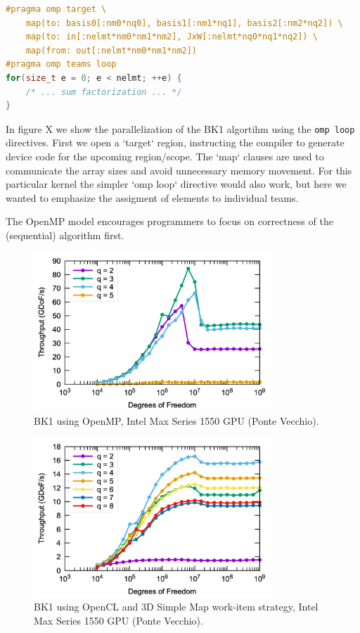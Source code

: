 \documentclass[a4paper,12pt]{article}
\begin{document}
\begin{lstlisting}[language=C++,caption={Simple C++ hello world},label={lst:cpp-hello}]
#pragma omp target \
    map(to: basis0[:nm0*nq0], basis1[:nm1*nq1], basis2[:nm2*nq2]) \
    map(to: in[:nelmt*nm0*nm1*nm2], JxW[:nelmt*nq0*nq1*nq2]) \
    map(from: out[:nelmt*nm0*nm1*nm2])
#pragma omp teams loop
for(size_t e = 0; e < nelmt; ++e) {
    /* ... sum factorization ... */
}
\end{lstlisting}

In figure X we show the parallelization of the BK1 algortihm using the \texttt{omp loop} directives. First we open a `target` region, instructing the compiler to generate
device code for the upcoming region/scope. The `map` clauses are used to communicate the
array sizes and avoid unnecessary memory movement.
For this particular kernel the simpler `omp loop` directive would also work, but here we wanted
to emphasize the assigment of elements to individual teams.

The OpenMP model encourages programmers to focus on correctness of the
(sequential) algorithm first.

\begin{figure}[htbp]
  \centering
  \includegraphics[width=0.8\textwidth]{pvc_openmp} %
  \caption{BK1 using OpenMP, Intel Max Series 1550 GPU (Ponte Vecchio).}
  \label{fig:pvc_openmp}
\end{figure}

\begin{figure}[htbp]
  \centering
  \includegraphics[width=0.8\textwidth]{pvc_opencl} %
  \caption{BK1 using OpenCL and 3D Simple Map work-item strategy, Intel Max Series 1550 GPU (Ponte Vecchio).}
  \label{fig:pvc_opencl}
\end{figure}
\end{document}
